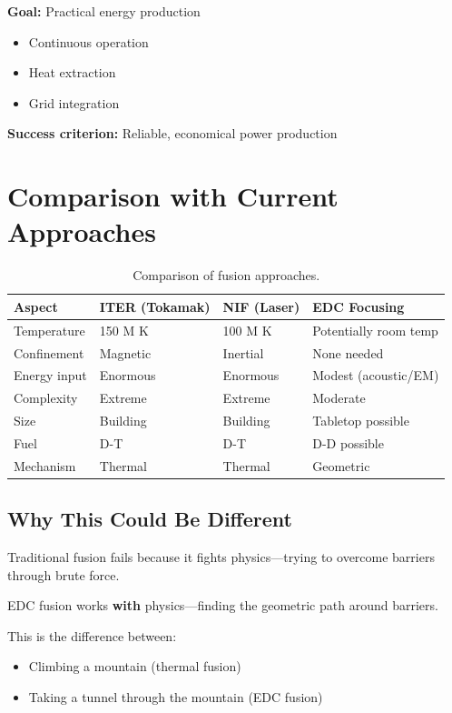 \documentclass[12pt,a4paper]{article}
\begin{document}
\textbf{Goal:} Practical energy production

\begin{itemize}
    \item Continuous operation
    \item Heat extraction
    \item Grid integration
\end{itemize}

\textbf{Success criterion:} Reliable, economical power production

\section{Comparison with Current Approaches}

\begin{table}[H]
\centering
\begin{tabular}{@{}llll@{}}
\toprule
\textbf{Aspect} & \textbf{ITER (Tokamak)} & \textbf{NIF (Laser)} & \textbf{EDC Focusing} \\
\midrule
Temperature & 150 M K & 100 M K & Potentially room temp \\
Confinement & Magnetic & Inertial & None needed \\
Energy input & Enormous & Enormous & Modest (acoustic/EM) \\
Complexity & Extreme & Extreme & Moderate \\
Size & Building & Building & Tabletop possible \\
Fuel & D-T & D-T & D-D possible \\
Mechanism & Thermal & Thermal & Geometric \\
\bottomrule
\end{tabular}
\caption{Comparison of fusion approaches.}
\end{table}

\subsection{Why This Could Be Different}

Traditional fusion fails because it fights physics---trying to overcome barriers through brute force.

EDC fusion works \textbf{with} physics---finding the geometric path around barriers.

\begin{insight}
This is the difference between:
\begin{itemize}
    \item Climbing a mountain (thermal fusion)
    \item Taking a tunnel through the mountain (EDC fusion)
\end{itemize}
\end{insight}
\end{document}
